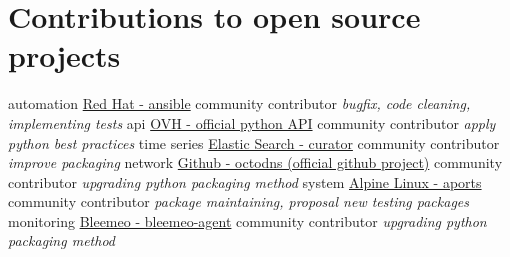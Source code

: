 \documentclass[]{friggeri-cv}
\begin{document}
\section{Contributions to open source projects}
\begin{entrylist}
    \entry
        {automation}
        {\href{https://github.com/ansible/ansible}{Red Hat - ansible}}
        {community contributor}
        {\emph{bugfix, code cleaning, implementing tests}}
    \entry
        {api}
        {\href{https://github.com/ovh/python-ovh}{OVH - official python API}}
        {community contributor}
        {\emph{apply python best practices}}
    \entry
        {time series}
        {\href{https://github.com/ovh/python-ovh}{Elastic Search - curator}}
        {community contributor}
        {\emph{improve packaging}}
    \entry
        {network}
        {\href{https://github.com/github/octodns}{Github - octodns (official github project)}}
        {community contributor}
        {\emph{upgrading python packaging method}}
    \entry
        {system}
        {\href{https://github.com/alpinelinux/aports}{Alpine Linux - aports}}
        {community contributor}
        {\emph{package maintaining, proposal new testing packages}}
    \entry
        {monitoring}
        {\href{https://github.com/bleemeo/bleemeo-agent}{Bleemeo - bleemeo-agent}}
        {community contributor}
        {\emph{upgrading python packaging method}}
\end{entrylist}


\newpage
\end{document}
